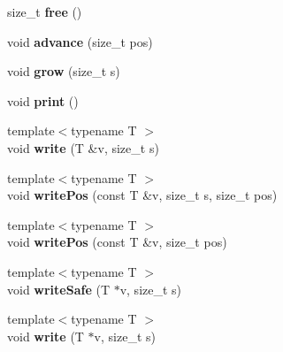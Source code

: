 \begin{DoxyCompactItemize}
size\+\_\+t {\bfseries free} ()
\item 
\hypertarget{classfaster_1_1fastCommBuffer_a55e2caa24b50fb9ff6619f3dd01c644a}{}\label{classfaster_1_1fastCommBuffer_a55e2caa24b50fb9ff6619f3dd01c644a} 
void {\bfseries advance} (size\+\_\+t pos)
\item 
\hypertarget{classfaster_1_1fastCommBuffer_a74eaeefb17821823451fcfc2238c6f95}{}\label{classfaster_1_1fastCommBuffer_a74eaeefb17821823451fcfc2238c6f95} 
void {\bfseries grow} (size\+\_\+t s)
\item 
\hypertarget{classfaster_1_1fastCommBuffer_a4dd1d988cd575cb815721b9acc3c30c3}{}\label{classfaster_1_1fastCommBuffer_a4dd1d988cd575cb815721b9acc3c30c3} 
void {\bfseries print} ()
\item 
\hypertarget{classfaster_1_1fastCommBuffer_a3b38d4b6332e864c9f7285961207a8dc}{}\label{classfaster_1_1fastCommBuffer_a3b38d4b6332e864c9f7285961207a8dc} 
{\footnotesize template$<$typename T $>$ }\\void {\bfseries write} (T \&v, size\+\_\+t s)
\item 
\hypertarget{classfaster_1_1fastCommBuffer_a4dc3d8c99ff08b1314fc36c77905dcbf}{}\label{classfaster_1_1fastCommBuffer_a4dc3d8c99ff08b1314fc36c77905dcbf} 
{\footnotesize template$<$typename T $>$ }\\void {\bfseries write\+Pos} (const T \&v, size\+\_\+t s, size\+\_\+t pos)
\item 
\hypertarget{classfaster_1_1fastCommBuffer_addda5fa378a3dfbb4ca1b14405b31c67}{}\label{classfaster_1_1fastCommBuffer_addda5fa378a3dfbb4ca1b14405b31c67} 
{\footnotesize template$<$typename T $>$ }\\void {\bfseries write\+Pos} (const T \&v, size\+\_\+t pos)
\item 
\hypertarget{classfaster_1_1fastCommBuffer_ac47c799234667ff23f5b5ddd699f2ed2}{}\label{classfaster_1_1fastCommBuffer_ac47c799234667ff23f5b5ddd699f2ed2} 
{\footnotesize template$<$typename T $>$ }\\void {\bfseries write\+Safe} (T $\ast$v, size\+\_\+t s)
\item 
\hypertarget{classfaster_1_1fastCommBuffer_a29d46f8bf3c72be5c52d27af129392c5}{}\label{classfaster_1_1fastCommBuffer_a29d46f8bf3c72be5c52d27af129392c5} 
{\footnotesize template$<$typename T $>$ }\\void {\bfseries write} (T $\ast$v, size\+\_\+t s)
\item 
\hypertarget{classfaster_1_1fastCommBuffer_ac70b22b40984e536be908ac6b57c06f1}{}\label{classfaster_1_1fastCommBuffer_ac70b22b40984e536be908ac6b57c06f1} 

\end{DoxyCompactItemize}
